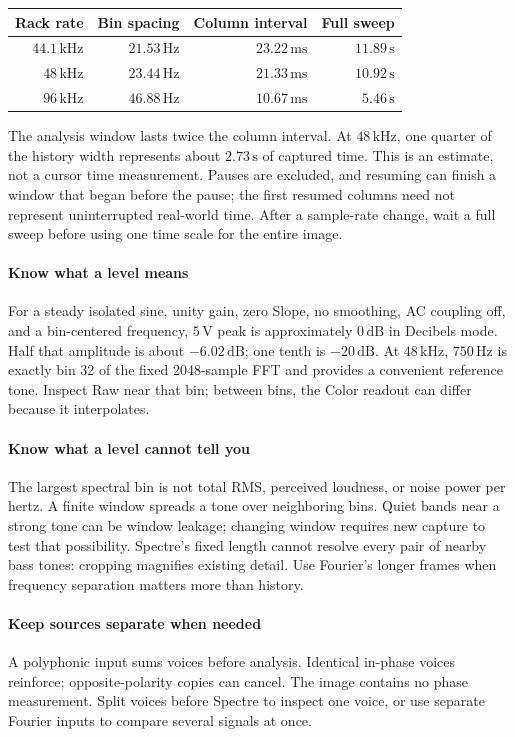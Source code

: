 \begin{center}
\renewcommand{\arraystretch}{1.25}
\begin{tabular}{@{}rrrr@{}}
\toprule
\textbf{Rack rate} & \textbf{Bin spacing} & \textbf{Column interval} & \textbf{Full sweep} \\
\midrule
$44.1\,\mathrm{kHz}$ & $21.53\,\mathrm{Hz}$ & $23.22\,\mathrm{ms}$ & $11.89\,\mathrm{s}$ \\
$48\,\mathrm{kHz}$ & $23.44\,\mathrm{Hz}$ & $21.33\,\mathrm{ms}$ & $10.92\,\mathrm{s}$ \\
$96\,\mathrm{kHz}$ & $46.88\,\mathrm{Hz}$ & $10.67\,\mathrm{ms}$ & $5.46\,\mathrm{s}$ \\
\bottomrule
\end{tabular}
\end{center}

The analysis window lasts twice the column interval. At $48\,\mathrm{kHz}$,
one quarter of the history width represents about $2.73\,\mathrm{s}$ of
captured time. This is an estimate, not a cursor time measurement. Pauses are
excluded, and resuming can finish a window that began before the pause; the
first resumed columns need not represent uninterrupted real-world time.
After a sample-rate change, wait a full sweep before using one time scale
for the entire image.

\paragraph{Know what a level means}
For a steady isolated sine, unity gain, zero Slope, no smoothing, AC coupling
off, and a bin-centered frequency, $5\,\mathrm{V}$ peak is approximately
$0\,\mathrm{dB}$ in Decibels mode. Half that amplitude is about
$-6.02\,\mathrm{dB}$; one tenth is $-20\,\mathrm{dB}$. At
$48\,\mathrm{kHz}$, $750\,\mathrm{Hz}$ is exactly bin 32 of the fixed
2048-sample FFT and provides a convenient reference tone. Inspect Raw near
that bin; between bins, the Color readout can differ because it interpolates.

\paragraph{Know what a level cannot tell you}
The largest spectral bin is not total RMS, perceived loudness, or noise power
per hertz. A finite window spreads a tone over neighboring bins. Quiet bands
near a strong tone can be window leakage; changing window requires new
capture to test that possibility. Spectre's fixed length cannot resolve every
pair of nearby bass tones: cropping magnifies existing detail. Use Fourier's
longer frames when frequency separation matters more than history.

\paragraph{Keep sources separate when needed}
A polyphonic input sums voices before analysis. Identical in-phase voices
reinforce; opposite-polarity copies can cancel. The image contains no phase
measurement. Split voices before Spectre to inspect one voice, or use separate
Fourier inputs to compare several signals at once.
